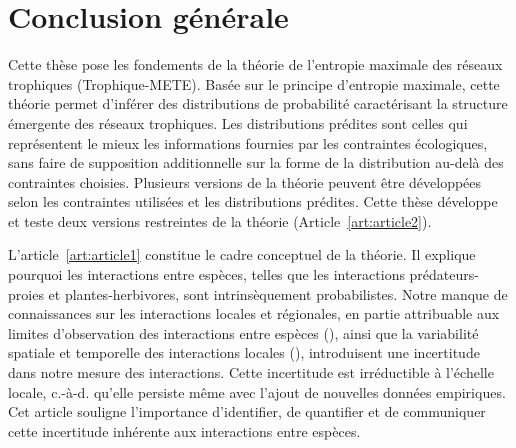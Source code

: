 
\francais   

\chapter{Conclusion générale}

Cette thèse pose les fondements de la théorie de l'entropie maximale des réseaux
trophiques (Trophique-METE). Basée sur le principe d'entropie maximale, cette
théorie permet d'inférer des distributions de probabilité caractérisant la
structure émergente des réseaux trophiques. Les distributions prédites sont
celles qui représentent le mieux les informations fournies par les contraintes
écologiques, sans faire de supposition additionnelle sur la forme de la
distribution au-delà des contraintes choisies. Plusieurs versions de la théorie
peuvent être développées selon les contraintes utilisées et les distributions
prédites. Cette thèse développe et teste deux versions restreintes de la théorie
(Article~\ref{art:article2}). 

L'article~\ref{art:article1} constitue le cadre conceptuel de la théorie. Il
explique pourquoi les interactions entre espèces, telles que les interactions
prédateurs-proies et plantes-herbivores, sont intrinsèquement probabilistes.
Notre manque de connaissances sur les interactions locales et régionales, en
partie attribuable aux limites d'observation des interactions entre espèces
(\cite{Jordano2016Sampling}), ainsi que la variabilité spatiale et temporelle
des interactions locales (\cite{Poisot2015Species}), introduisent une
incertitude dans notre mesure des interactions. Cette incertitude est
irréductible à l'échelle locale, c.-à-d. qu'elle persiste même avec l'ajout de
nouvelles données empiriques. Cet article souligne l'importance d'identifier, de
quantifier et de communiquer cette incertitude inhérente aux interactions entre
espèces. 

